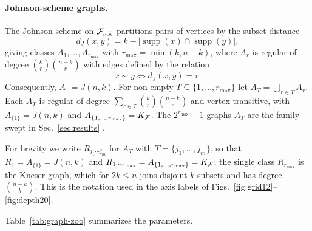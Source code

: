 \paragraph*{Johnson-scheme graphs.} The Johnson scheme on $\mathcal{F}_{n,k}$
partitions pairs of vertices by the subset distance
\begin{equation}
d_J(x,y)=k-|\operatorname{supp}(x)\cap\operatorname{supp}(y)| ,
    \label{eq:johnson-distance}
\end{equation}
giving classes $A_1,\dots,A_{r_{\max}}$ with $r_{\max}=\min(k,n-k)$, where $A_r$ is regular of degree $\binom{k}{r}\binom{n-k}{r}$ with edges defined by the relation
\begin{equation}
x \sim y \iff d_J(x,y) = r.
\end{equation} 
Consequently, $A_1=J(n,k)$. For non-empty $T\subseteq\{1,\dots,r_{\max}\}$ let $A_T=\bigcup_{r\in T}A_r$. Each $A_T$ is regular of degree $\sum_{r\in T}\binom{k}{r}\binom{n-k}{r}$ and vertex-transitive, with $A_{\{1\}}=J(n,k)$ and $A_{\{1,\dots,r_{\max}\}}=K_{\mathcal{F}}$. The $2^{r_{\max}}-1$ graphs $A_T$ are the family swept in Sec.~\ref{sec:results} .

For brevity we write $R_{j_1\cdots j_m}$ for $A_T$ with $T=\{j_1,\dots,j_m\}$, so that $R_1=A_{\{1\}}=J(n,k)$ and $R_{1\cdots r_{\max}}=A_{\{1,\dots,r_{\max}\}}=K_{\mathcal{F}}$; the single class $R_{r_{\max}}$ is  the Kneser graph, which for $2k\le n$ joins disjoint $k$-subsets and has degree $\binom{n-k}{k}$. This is the notation used in the axis labels of Figs.~\ref{fig:grid12}--\ref{fig:depth20}.

Table~\ref{tab:graph-zoo} summarizes the parameters. 


